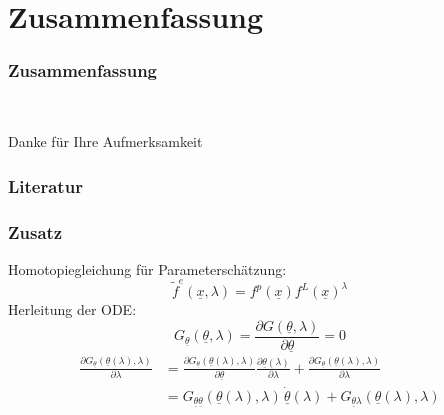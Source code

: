 \documentclass[18pt]{beamer}
\begin{document}
\section{Zusammenfassung}
\begin{frame}
    \frametitle{Zusammenfassung}

\end{frame}

\begin{frame}{~}
	\begin{center}
		\huge{Danke für Ihre Aufmerksamkeit}
	\end{center}
\end{frame}

\begin{frame}
    \frametitle{Literatur}
    
    
\end{frame}

\begin{frame}
    \frametitle{Zusatz}
    Homotopiegleichung für Parameterschätzung:
    \begin{equation}
        \tilde{f}^{e}(\underline{x},\lambda) = f^p(\underline{x})f^L(\underline{x})^{\lambda}
    \end{equation}
    Herleitung der ODE:
    \begin{equation}
        G_{\underline{\theta}}(\underline{\theta}, \lambda) = \frac{\partial G(\underline{\theta}, \lambda)}{\partial \underline{\theta}} = 0 
    \end{equation}
    \begin{equation}
        \begin{split}
            \frac{\partial G_{\underline{\theta}}(\underline{\theta}(\lambda),\lambda)}{\partial \lambda} &= \frac{\partial G_{\underline{\theta}}(\underline{\theta}(\lambda),\lambda)}{\partial \underline{\theta}} \frac{\partial \underline{\theta}(\lambda)}{\partial \lambda} + \frac{\partial G_{\underline{\theta}}(\underline{\theta}(\lambda),\lambda)}{\partial \lambda} \\
            &= G_{\underline{\theta}\underline{\theta}}(\underline{\theta}(\lambda),\lambda) \, \underline{\dot{\theta}}(\lambda) + G_{\underline{\theta}\lambda}(\underline{\theta}(\lambda),\lambda) 
        \end{split}
    \end{equation}
\end{frame}
\end{document}
